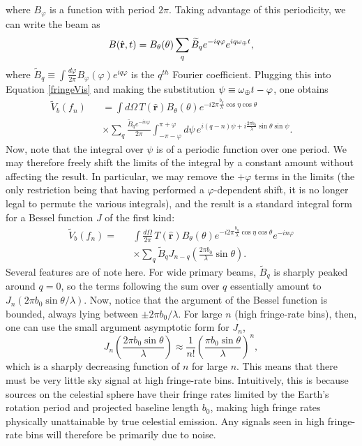 \documentclass[twocolumn,apj,numberedappendix]{emulateapj}
\newcommand{\rhat}{\hat{\mathbf{r}}}
\begin{document}
where $B_\varphi$ is a function with period $2\pi$.  Taking advantage of this periodicity, we can write the beam as
\begin{equation}
B(\rhat, t) = B_\theta (\theta) \sum_q \widetilde{B}_q e^{-iq \varphi} e^{i q \omega_\Earth t},
\end{equation}
where $\widetilde{B}_q \equiv \int \frac{d\varphi}{2\pi} B_\varphi(\varphi)
e^{i q\varphi}$ is the $q^{th}$ Fourier coefficient.  Plugging this into
Equation \eqref{fringeVis} and making the substitution $\psi \equiv
\omega_\oplus t - \varphi$, one obtains
\begin{eqnarray}
\widetilde{V}_b (f_n) &&= \int d\Omega \, T(\rhat) B_\theta (\theta) e^{-i 2 \pi  \frac{b_y}{\lambda} \cos \eta \cos \theta} \nonumber \\
&& \times \sum_q \frac{\widetilde{B}_q e^{-i n \varphi}}{2 \pi} \int_{-\pi -\varphi}^{\pi+\varphi} d\psi \, e^{i (q-n) \psi +i \frac{2 \pi b_0}{\lambda} \sin \theta \sin \psi}. \qquad
\end{eqnarray}
Now, note that the integral over $\psi$ is of a periodic function over one
period.  We may therefore freely shift the limits of the integral by a constant
amount without affecting the result.  In particular, we may remove the
$+\varphi$ terms in the limits (the only restriction being that having performed a $\varphi$-dependent shift, it is no longer legal to permute the various integrals), and
the result is a standard integral form for a Bessel function $J$ of the first
kind:
\begin{eqnarray}
\label{fringeBessel}
\widetilde{V}_b (f_n) =&& \int \frac{d\Omega}{2 \pi}\, T(\rhat) B_\theta (\theta) e^{-i 2 \pi  \frac{b_y}{\lambda} \cos \eta \cos \theta}
e^{-i n \varphi} \nonumber \\ 
&& \times \sum_q \widetilde{B}_q  J_{n-q} \left( \frac{2 \pi b_0}{\lambda} \sin \theta \right).
\end{eqnarray}
Several features are of note here.  For wide primary beams, $\widetilde{B}_q$
is sharply peaked around $q=0$, so the terms following the sum over $q$
essentially amount to $J_n ( 2 \pi b_0 \sin \theta / \lambda )$.  Now, notice
that the argument of the Bessel function is bounded, always lying between $\pm
2\pi b_0/ \lambda$.  For large $n$ (high fringe-rate bins), then, one can use
the small argument asymptotic form for $J_n$,\begin{equation}
J_n \left( \frac{2 \pi b_0 \sin \theta}{ \lambda} \right) \approx \frac{1}{n!} \left( \frac{ \pi b_0 \sin \theta}{ \lambda} \right)^n,
\end{equation}
which is a sharply decreasing function of $n$ for large $n$.  This means that
there must be very little sky signal at high fringe-rate bins.  Intuitively,
this is because sources on the celestial sphere have their fringe rates limited
by the Earth's rotation period and projected baseline length $b_0$, making high
fringe rates physically unattainable by true celestial emission.  Any signals
seen in high fringe-rate bins will therefore be primarily due to noise.
\end{document}
